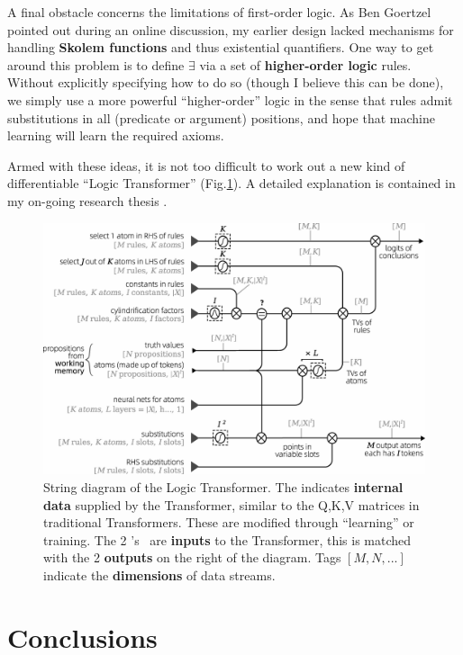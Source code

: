 \documentclass[runningheads]{llncs}
\begin{document}
A final obstacle concerns the limitations of first-order logic.  As Ben Goertzel pointed out during an online discussion, my earlier design lacked mechanisms for handling \textbf{Skolem functions} and thus existential quantifiers.  One way to get around this problem is to define $\exists$ via a set of \textbf{higher-order logic} rules.  Without explicitly specifying how to do so (though I believe this can be done), we simply use a more powerful ``higher-order'' logic in the sense that rules admit substitutions in all (predicate or argument) positions, and hope that machine learning will learn the required axioms.

Armed with these ideas, it is not too difficult to work out a new kind of differentiable ``Logic Transformer'' (Fig.\ref{fig:string-diagram}).  A detailed explanation is contained in my on-going research thesis \cite{}.

\begin{figure}
	\hspace{-3cm}
	\includegraphics[scale=.7]{logic-Transformer-string-diagram-3.png}
	\caption{String diagram of the Logic Transformer.  The {\LARGE\color{gray}\RIGHTarrow} indicates \textbf{internal data} supplied by the Transformer, similar to the Q,K,V matrices in traditional Transformers.  These are modified through ``learning'' or training.  The 2 \RIGHTarrow's \ are \textbf{inputs} to the Transformer, this is matched with the 2 \textbf{outputs} on the right of the diagram.  Tags {\color{gray}$[M,N,...]$} indicate the \textbf{dimensions} of data streams.}
	\label{fig:string-diagram}
\end{figure}

\section*{Conclusions}
\end{document}
